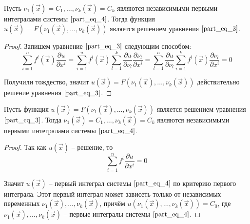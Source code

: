 \documentclass[a4paper, 12pt]{article}
\begin{document}
    \begin{theorem}
        Пусть $\nu_1 \left( \overrightarrow{x} \right) = C_1, \dots, \nu_k \left( \overrightarrow{x} \right) = C_k$ являются независимыми первыми интегралами системы $\eqref{part_eq_4}$. Тогда функция $u \left( \overrightarrow{x} \right) = F \left( \nu_1 \left( \overrightarrow{x} \right), \dots, \nu_k \left( \overrightarrow{x} \right) \right) $ является решением уравнения $\eqref{part_eq_3}$.
    \end{theorem}
    \begin{proof}
        Запишем уравнение $\eqref{part_eq_3}$ следующим способом:
        \begin{equation*}
            \sum \limits_{i = 1}^{n} f^{i} \left( \overrightarrow{x} \right)  \frac{\partial u}{\partial x^{i}} = \sum \limits_{i = 1}^{n} f^{i} \left( \overrightarrow{x} \right)  \sum \limits_{l = 1}^{k} \frac{\partial u}{\partial \nu_l} \frac{\partial \nu_l}{\partial x^{i}} = \sum \limits_{l = 1}^{n} \frac{\partial u}{\partial \nu_l} \sum \limits_{i = 1}^{k} f^{i} \left( \overrightarrow{x} \right)  \frac{\partial \nu_l}{\partial x^{i}} = 0
        \end{equation*}

        Получили тождество, значит $u \left( \overrightarrow{x} \right) = F \left( \nu_1 \left( \overrightarrow{x} \right), \dots, \nu_k \left( \overrightarrow{x} \right) \right)$ действительно решение уравнения $\eqref{part_eq_3}$.
    \end{proof}

    \begin{theorem}
        Пусть функция $u \left( \overrightarrow{x} \right) = F \left( \nu_1 \left( \overrightarrow{x} \right), \dots, \nu_k \left( \overrightarrow{x} \right) \right)$ является решением уравнения $\eqref{part_eq_3}$. Тогда $\nu_1 \left( \overrightarrow{x} \right) = C_1, \dots, \nu_k \left( \overrightarrow{x} \right) = C_k$ являются независимыми первыми интегралами системы $\eqref{part_eq_4}$. 
    \end{theorem}
    \begin{proof}
        Так как $u \left( \overrightarrow{x} \right)$ -- решение, то 
        \begin{equation*}
            \sum \limits_{i = 1}^{n} f^i \frac{\partial u}{\partial x^i} = 0
        \end{equation*}

        Значит $u \left( \overrightarrow{x} \right)$ -- первый интеграл системы $\eqref{part_eq_4}$ по критерию первого интеграла. Этот первый интеграл может зависеть только от независимых переменных $\nu_1 \left( \overrightarrow{x} \right), \dots, \nu_k \left( \overrightarrow{x} \right)$, причём $u \left( \nu_1 \left( \overrightarrow{x} \right), \dots, \nu_k \left( \overrightarrow{x} \right) \right) = C_0$, где $\nu_1 \left( \overrightarrow{x} \right), \dots, \nu_k \left( \overrightarrow{x} \right)$ -- первые интегралы системы $\eqref{part_eq_4}$.
    \end{proof}
\end{document}
